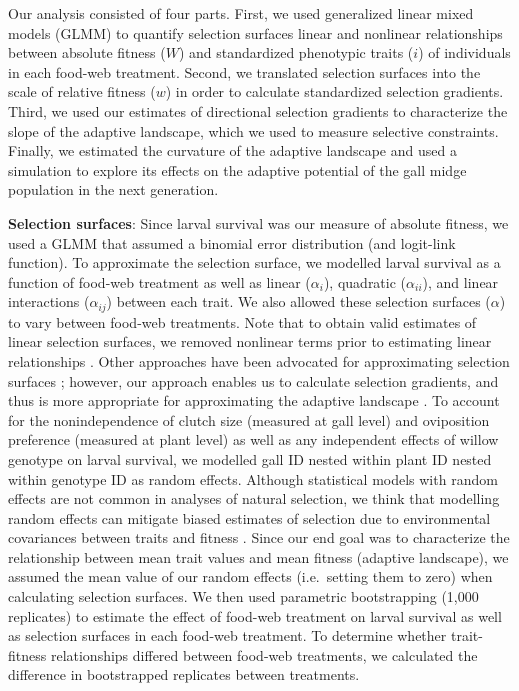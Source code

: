 \documentclass[11pt,]{article}
\begin{document}
Our analysis consisted of four parts. First, we used generalized linear
mixed models (GLMM) to quantify selection surfaces \textemdash linear
and nonlinear relationships between absolute fitness (\(W\)) and
standardized phenotypic traits (\(i\)) of individuals \textemdash in
each food-web treatment. Second, we translated selection surfaces into
the scale of relative fitness (\(w\)) in order to calculate standardized
selection gradients. Third, we used our estimates of directional
selection gradients to characterize the slope of the adaptive landscape,
which we used to measure selective constraints. Finally, we estimated
the curvature of the adaptive landscape and used a simulation to explore
its effects on the adaptive potential of the gall midge population in
the next generation.

\textbf{Selection surfaces}: Since larval survival was our measure of
absolute fitness, we used a GLMM that assumed a binomial error
distribution (and logit-link function). To approximate the selection
surface, we modelled larval survival as a function of food-web treatment
as well as linear (\(\alpha_i\)), quadratic (\(\alpha_{ii}\)), and
linear interactions (\(\alpha_{ij}\)) between each trait. We also
allowed these selection surfaces (\(\alpha\)) to vary between food-web
treatments. Note that to obtain valid estimates of linear selection
surfaces, we removed nonlinear terms prior to estimating linear
relationships \citep{Lande1983}. Other approaches have been advocated
for approximating selection surfaces \citep{Schluter1988}; however, our
approach enables us to calculate selection gradients, and thus is more
appropriate for approximating the adaptive landscape \citep{Arnold2003}.
To account for the nonindependence of clutch size (measured at gall
level) and oviposition preference (measured at plant level) as well as
any independent effects of willow genotype on larval survival, we
modelled gall ID nested within plant ID nested within genotype ID as
random effects. Although statistical models with random effects are not
common in analyses of natural selection, we think that modelling random
effects can mitigate biased estimates of selection due to environmental
covariances between traits and fitness \citep{Rausher1992}. Since our
end goal was to characterize the relationship between mean trait values
and mean fitness (adaptive landscape), we assumed the mean value of our
random effects (i.e.~setting them to zero) when calculating selection
surfaces. We then used parametric bootstrapping (1,000 replicates) to
estimate the effect of food-web treatment on larval survival as well as
selection surfaces in each food-web treatment. To determine whether
trait-fitness relationships differed between food-web treatments, we
calculated the difference in bootstrapped replicates between treatments.
\end{document}
